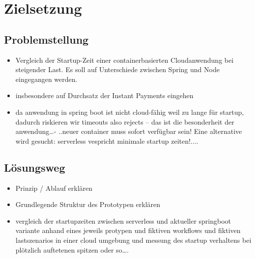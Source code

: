 \chapter{Zielsetzung}

\section{Problemstellung}
\begin{itemize}
  \item Vergleich der Startup-Zeit einer containerbasierten Cloudanwendung bei steigender Last. Es soll auf Unterschiede zwischen Spring und Node eingegangen werden.
  \item insbesondere auf Durchsatz der Instant Payments eingehen
  \item da anwendung in spring boot ist nicht cloud-fähig weil zu lange für startup, dadurch riskieren wir timeouts also rejects – das ist die besonderheit der anwendung…- ..neuer container muss sofort verfügbar sein! Eine alternative wird gesucht: serverless vespricht minimale startup zeiten!....
\end{itemize}

\section{L\"osungsweg}
\begin{itemize}
  \item Prinzip / Ablauf erklären
  \item Grundlegende Struktur des Prototypen erklären
  \item vergleich der startupzeiten zwischen serverless und aktueller springboot variante anhand eines jeweils protypen und fiktiven workflows und fiktiven lastszenarios in einer cloud umgebung und messung des startup verhaltens bei plötzlich auftetenen spitzen oder so….
\end{itemize}


\cite{Knuth:1998:ACP:280635}